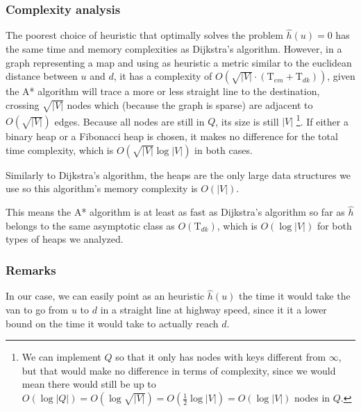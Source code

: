 \subsubsection{Complexity analysis}
The poorest choice of heuristic that optimally solves the problem $\hat{h}(u)=0$ has the same time and memory complexities as Dijkstra's algorithm. However, in a graph representing a map and using as heuristic a metric similar to the euclidean distance between $u$ and $d$, it has a complexity of $O(\sqrt{|V|} \cdot (\text{T}_{em}+\text{T}_{dk}))$, given the A* algorithm will trace a more or less straight line to the destination, crossing $\sqrt{|V|}$ nodes which (because the graph is sparse) are adjacent to $O(\sqrt{|V|})$ edges. Because all nodes are still in $Q$, its size is still $|V|$ \footnote{We can implement $Q$ so that it only has nodes with keys different from $\infty$, but that would make no difference in terms of complexity, since we would mean there would still be up to $O(\log |Q|)=O(\log \sqrt{|V|})=O(\frac{1}{2}\log |V|)=O(\log |V|)$ nodes in $Q$.}.
If either a binary heap or a Fibonacci heap is chosen, it makes no difference for the total time complexity, which is $O(\sqrt{|V|} \log |V|)$ in both cases.\par
Similarly to Dijkstra's algorithm, the heaps are the only large data structures we use so this algorithm's memory complexity is $O(|V|)$.\par
This means the A* algorithm is at least as fast as Dijkstra's algorithm so far as $\hat{h}$ belongs to the same asymptotic class as $O(\text{T}_{dk})$, which is $O(\log |V|)$ for both types of heaps we analyzed.
\subsubsection{Remarks}
In our case, we can easily point as an heuristic $\hat{h}(u)$ the time it would take the van to go from $u$ to $d$ in a straight line at highway speed, since it it a lower bound on the time it would take to actually reach $d$.

